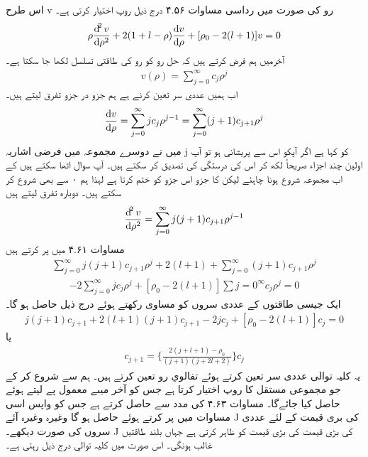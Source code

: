   اس طرح v رو کی صورت میں رداسی مساوات ۴.۵۶ 
  درج ذیل روپ اختیار کرتی ہے۔
  \begin{align}
\rho\frac{\dif^{2}{v}}{\dif{\rho^{2}}}+2(1+l-\rho)\frac{\dif{v}}{\dif{\rho}}+[\rho_{0}-2(l+1)]v=0 
\end{align}
  آخرمیں ہم فرض کرتے ہیں کہ حل
    رو کو رو کی طاقتی تسلسل لکھا جا سکتا ہے۔
  \begin{align}
v(\rho)=\sum_{j=0}^{\infty}c_{j}\rho^{j} 
\end{align}
اب ہمیں عددی سر 
تعین کرنے ہے ہم جزو در جزو تفرق لیتے ہیں۔
\begin{align}
\frac{\dif{v}}{\dif{\rho}}=\sum_{j=0}^{\infty}jc_{j}\rho^{j-1}=\sum_{j=0}^{\infty}(j+1)c_{j+1}\rho^{j} 
\end{align}
میں نے دوسرے مجموعہ میں فرضی اشاریہ j کو 
کہا ہے اگر آپکو اس سے پریشانی ہو تو آپ اولین چند اجزاء صریحاً لکھ کر اس کی درستگی کی تصدیق کر سکتے ہیں۔ آپ سوال اٹھا سکتے ہیں کے اب مجموعہ
شروع ہونا چاہئے لیکن
کا جزو اس جزو کو ختم کرتا ہے لہذا ہم ۰ سے بھی شروع کر سکتے ہیں۔ دوبارہ تفرق لیتے ہیں
\begin{align}
\frac{\dif^{2}{v}}{\dif{\rho^{2}}}=\sum_{j=0}^{\infty}j(j+1)c_{j+1}\rho^{j-1} 
\end{align}
مساوات ۴.۶۱ میں پر کرتے ہیں
\begin{align}
\sum_{j=0}^{\infty}j(j+1)c_{j+1}\rho^{j}+2(l+1)+\sum_{j=0}^{\infty}(j+1)c_{j+1}\rho^{j} 
\end{align}
\begin{align}
-2\sum_{j=0}^{\infty}jc_{j}\rho^{j}+[\rho_{0}-2(l+1)]\sum{j=0}^{\infty}c_{j}\rho^{j}=0 
\end{align}
ایک جیسی طاقتوں کے عددی سروں کو مساوی رکھتے ہوئے درج ذیل حاصل ہو گا۔
\begin{align}
j(j+1)c_{j+1}+2(l+1)(j+1)c_{j+1}-2jc_{j}+[\rho_{0}-2(l+1)]c_{j}=0 
\end{align}
یا
\begin{align}
c_{j+1}=\big\{\frac{2(j+l+1)-\rho_{0}}{(j+1)(j+2l+2)}\big\}c_{j} 
\end{align}
یہ کلیہ توالی عددی سر تعین کرتے ہوئے تفالوي رو تعین کرتے ہیں۔ ہم
سے شروع کر کے جو مجموعی مستقل کا روپ اختیار کرتا ہے جس کو آخر میںے معمول پے لیتے ہوئے حاصل کیا جائےگا۔
مساوات ۴.۶۳ کی مدد سے 
حاصل کرتے ہے جس کو واپس اسی مساوات میں پر کرتے ہوئے
حاصل ہو گا وغیرہ وغیرہ آئے J کی بری قیمت کے لئے عددی سروں کی صورت دیکھے۔ J کی بڑی قیمت 
 کی بڑی قیمت کو ظاہر کرتی ہے جہاں بلند طاقتیں غالب ہونگی۔ اس صورت میں کلیہ توالي درج ذیل رہتی ہے۔
